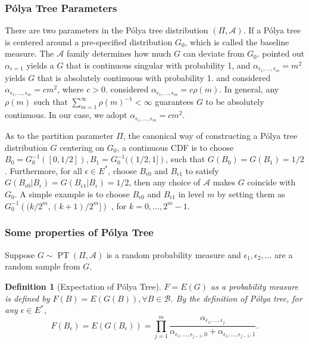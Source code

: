 \documentclass[12pt]{article}
\newtheorem{deff}[thm]{Definition}
\newcommand{\polya}{P\'{o}lya}
\DeclareMathOperator{\pt}{PT}
\begin{document}
\subsubsection{\polya{} Tree Parameters}
There are two parameters in the \polya{} tree distribution $(\Pi,
\mathcal{A})$. If a \polya{} tree is centered around a
  pre-specified distribution $G_0$, which is called the baseline
  measure. The $\mathcal{A}$ family determines how much $G$ can
deviate from $G_0$. \citet{ferguson1974} pointed out $\alpha_{\epsilon = 1}
$ yields a $G$ that is continuous singular with probability 1, and
$\alpha_{\epsilon_1, \ldots, \epsilon_m} = m^2$ yields $G$ that is
absolutely continuous with probability 1. \citet{walker1999} and
\citet{paddock1999} considered $\alpha_{\epsilon_1, \ldots,
  \epsilon_m} = cm^2$, where $c > 0$. \citet{berger2001} considered
$\alpha_{\epsilon_1, \ldots, \epsilon_m} = c \rho(m)$. In general, any
$\rho(m) $ such that $\sum_{m=1}^{\infty} \rho(m)^{-1} < \infty$
guarantees $G$ to be absolutely continuous. In our case, we adopt
$\alpha_{\epsilon_1, \ldots, \epsilon_m} = cm^2$.

As to the partition parameter $\Pi$, the canonical way of constructing
a \polya{} tree distribution $G$ centering on $G_0$, a continuous CDF
is to choose $B_0 = G^{-1}_0 ([0, 1/2]), B_1 = G^{-1}_0 ((1/2,1])$,
such that $G(B_0) = G(B_1)= 1/2$. Furthermore, for all $\epsilon \in
E^{*}$, choose $B_{\epsilon 0 }$ and $B_{\epsilon 1}$ to satisfy
$G(B_{\epsilon 0 } |B_{\epsilon} ) = G(B_{\epsilon 1} | B_{\epsilon})
= 1/2 $, then any choice of $\mathcal{A} $ makes $G$ coincide with
$G_0$. A simple example is to choose $B_{\epsilon 0} $ and
$B_{\epsilon 1}$ in level $m$ by setting them as $G^{-1}_0 \left(
  (k/2^m, (k+1)/2^m] \right)$ , for $k=0, \ldots, 2^m-1$.

\subsubsection{Some properties of \polya{} Tree}
Suppose $G \sim \pt (\Pi, \mathcal{A})$ is a random probability
measure and $\epsilon_1, \epsilon_2, \ldots$ are a random sample from
$G$.

\begin{deff}[Expectation of \polya{} Tree]
  $F= E(G)$ as a probability measure is defined by $F(B) = E(G(B)),
  \forall B \in \mathcal{B}$. By the definition of \polya{} tree, for
  any $\epsilon \in E^{*}$,
  \begin{displaymath}
    F(B_{\epsilon})  = E(G(B_{\epsilon})) = \prod_{j=1}^m
    \frac{\alpha_{\epsilon_1, \ldots, \epsilon_j}}{\alpha_{\epsilon_1,
        \ldots, \epsilon_{j-1},0} + \alpha_{\epsilon_1, \ldots, \epsilon_{j-1},1}}.
  \end{displaymath}
\end{deff}
\end{document}
